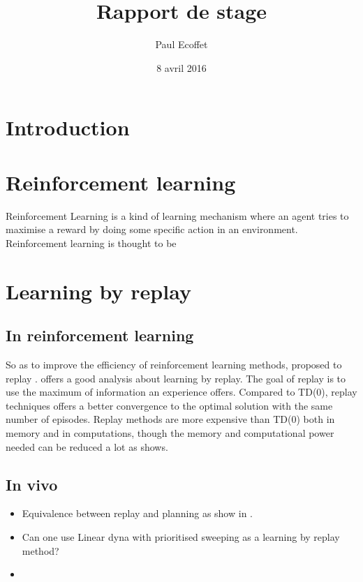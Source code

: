 \documentclass[]{report}
\title{Rapport de stage}
\author{Paul Ecoffet}
\date{8 avril 2016}
\begin{document}
\maketitle

{
\hypersetup{linkcolor=black}
\setcounter{tocdepth}{3}
\tableofcontents
}
\section{Introduction}\label{introduction}

\section{Reinforcement learning}\label{reinforcement-learning}

Reinforcement Learning is a kind of learning mechanism where an agent tries to maximise a reward by doing some specific action in an environment. Reinforcement learning is thought to be

\section{Learning by replay}\label{learning-by-replay}

\subsection{In reinforcement learning}
\label{sub:In reinforcement learning}

So as to improve the efficiency of reinforcement learning methods,  proposed to replay . \cite{vanseijen_deeper_2015} offers a good analysis about learning by replay. The goal of replay is to use the maximum of information an experience offers. Compared to TD(0), replay techniques offers a better convergence to the optimal solution with the same number of episodes. Replay methods are more expensive than TD(0) both in memory and in computations, though the memory and computational power needed can be reduced a lot as \cite{vanseijen_deeper_2015} shows.

\subsection{In vivo}
\label{sub:In vivo}

\cite{gupta_hippocampal_2010}

\begin{itemize}
\itemsep1pt\parskip0pt
\item
  Equivalence between replay and planning as show in \cite{vanseijen_deeper_2015}.
\item
  Can one use Linear dyna with prioritised sweeping as a learning by replay method?
\item

\end{itemize}
\end{document}
